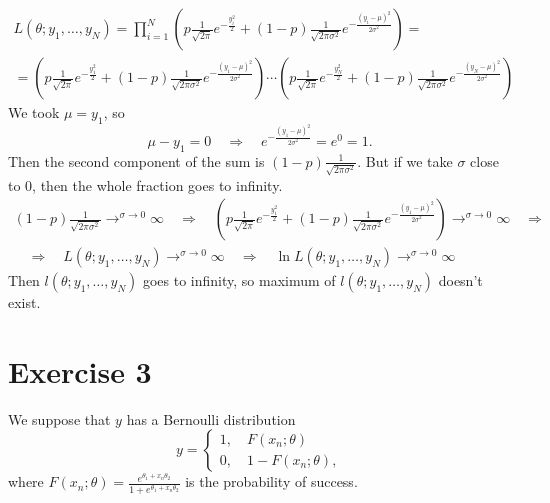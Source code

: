 \documentclass[12pt, a4paper]{article}\usepackage[]{graphicx}\usepackage[]{color}
\begin{document}
\begin{gather*}
L(\theta; y_1,\dots,y_N)
  = \prod_{i=1}^N \left(  p  \frac{1}{\sqrt{2\pi}} e^{-\frac{y_i^2}{2}} + (1-p)\frac{1}{\sqrt{2\pi\sigma^2}} e^{-\frac{(y_i-\mu)^2}{2\sigma^2}}  \right) = \\
  = \left(  p  \frac{1}{\sqrt{2\pi}} e^{-\frac{y_1^2}{2}} + (1-p)\frac{1}{\sqrt{2\pi\sigma^2}} e^{-\frac{(y_1-\mu)^2}{2\sigma^2}}  \right) \cdots
    \left(  p  \frac{1}{\sqrt{2\pi}} e^{-\frac{y_N^2}{2}} + (1-p)\frac{1}{\sqrt{2\pi\sigma^2}} e^{-\frac{(y_N-\mu)^2}{2\sigma^2}}  \right)
\end{gather*}
We took $\mu = y_1$, so  
\[ \mu - y_1 = 0 \quad\Rightarrow\quad e^{-\frac{(y_1-\mu)^2}{2\sigma^2}} = e^0 = 1. \]
Then the second component of the sum is $(1-p)\frac{1}{\sqrt{2\pi\sigma^2}}$. But if we take $\sigma$ close to 0, then the whole fraction goes to infinity.
\begin{gather*} 
  (1-p)\frac{1}{\sqrt{2\pi\sigma^2}} \rightarrow^{\sigma\rightarrow 0}  \infty 
  \quad\Rightarrow\quad 
  \left(  p  \frac{1}{\sqrt{2\pi}} e^{-\frac{y_1^2}{2}} + (1-p)\frac{1}{\sqrt{2\pi\sigma^2}} e^{-\frac{(y_1-\mu)^2}{2\sigma^2}}  \right) \rightarrow^{\sigma\rightarrow 0} \infty \quad\Rightarrow\quad \\
  \quad\Rightarrow\quad 
  L(\theta; y_1,\dots,y_N) \rightarrow^{\sigma\rightarrow 0} \infty 
  \quad\Rightarrow\quad 
  \ln{L(\theta; y_1,\dots,y_N)} \rightarrow^{\sigma\rightarrow 0} \infty 
\end{gather*}
Then $l(\theta; y_1,\dots,y_N)$ goes to infinity, so maximum of $l(\theta; y_1,\dots,y_N)$ doesn't exist.



\section{Exercise 3}

We suppose that $y$ has a Bernoulli distribution
\[ y= 
\begin{cases}
  1, \quad F(x_n; \theta) \\
  0, \quad 1-F(x_n; \theta),
\end{cases}
\]
where $F(x_n; \theta) = \frac{e^{\theta_1 + x_n \theta_2}}{1+e^{\theta_1 + x_n \theta_2}}$ is the probability of success.
\end{document}
